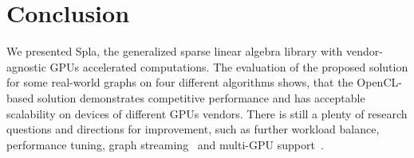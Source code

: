 \section{Conclusion}

We presented Spla, the generalized sparse linear algebra library with vendor-agnostic GPUs accelerated computations. The evaluation of the proposed solution for some real-world graphs on four different algorithms shows, that the OpenCL-based solution demonstrates competitive performance and has acceptable scalability on devices of different GPUs vendors. There is still a plenty of research questions and directions for improvement, such as further workload balance, performance tuning, graph streaming~\cite{10.1145/2600212.2600227} and multi-GPU support~\cite{7967137}.
